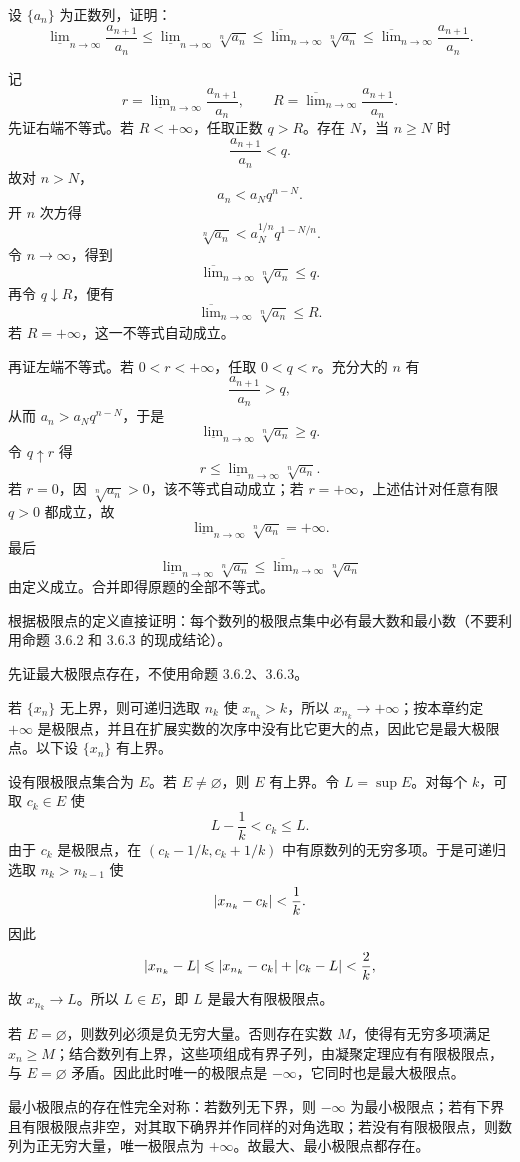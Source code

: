 \begin{xexercise}[5]
设 $\{a_n\}$ 为正数列，证明：
  \[
    \underline{\lim}_{n\to\infty}\frac{a_{n+1}}{a_n}
    \leqslant\underline{\lim}_{n\to\infty}\sqrt[n]{a_n}
    \leqslant\overline{\lim}_{n\to\infty}\sqrt[n]{a_n}
    \leqslant\overline{\lim}_{n\to\infty}\frac{a_{n+1}}{a_n}.
  \]
\end{xexercise}
\begin{xsolution}
记
\[
  r=\underline{\lim}_{n\to\infty}\frac{a_{n+1}}{a_n},
  \qquad
  R=\overline{\lim}_{n\to\infty}\frac{a_{n+1}}{a_n}.
\]
先证右端不等式。若 $R<+\infty$，任取正数 $q>R$。存在 $N$，当 $n\geqslant N$ 时
\[
  \frac{a_{n+1}}{a_n}<q.
\]
故对 $n>N$，
\[
  a_n<a_Nq^{n-N}.
\]
开 $n$ 次方得
\[
  \sqrt[n]{a_n}<a_N^{1/n}q^{1-N/n}.
\]
令 $n\to\infty$，得到
\[
  \overline{\lim}_{n\to\infty}\sqrt[n]{a_n}\leqslant q.
\]
再令 $q\downarrow R$，便有
\[
  \overline{\lim}_{n\to\infty}\sqrt[n]{a_n}\leqslant R.
\]
若 $R=+\infty$，这一不等式自动成立。

再证左端不等式。若 $0<r<+\infty$，任取 $0<q<r$。充分大的 $n$ 有
\[
  \frac{a_{n+1}}{a_n}>q,
\]
从而 $a_n>a_Nq^{n-N}$，于是
\[
  \underline{\lim}_{n\to\infty}\sqrt[n]{a_n}\geqslant q.
\]
令 $q\uparrow r$ 得
\[
  r\leqslant\underline{\lim}_{n\to\infty}\sqrt[n]{a_n}.
\]
若 $r=0$，因 $\sqrt[n]{a_n}>0$，该不等式自动成立；若 $r=+\infty$，上述估计对任意有限 $q>0$ 都成立，故
\[
  \underline{\lim}_{n\to\infty}\sqrt[n]{a_n}=+\infty.
\]
最后
\[
  \underline{\lim}_{n\to\infty}\sqrt[n]{a_n}
  \leqslant
  \overline{\lim}_{n\to\infty}\sqrt[n]{a_n}
\]
由定义成立。合并即得原题的全部不等式。
\end{xsolution}


\begin{xexercise}[6]
根据极限点的定义直接证明：每个数列的极限点集中必有最大数和最小数（不要利用命题 3.6.2 和 3.6.3 的现成结论）。
\end{xexercise}
\begin{xsolution}
先证最大极限点存在，不使用命题 3.6.2、3.6.3。

若 $\{x_n\}$ 无上界，则可递归选取 $n_k$ 使 $x_{n_k}>k$，所以 $x_{n_k}\to+\infty$；按本章约定 $+\infty$ 是极限点，并且在扩展实数的次序中没有比它更大的点，因此它是最大极限点。以下设 $\{x_n\}$ 有上界。

设有限极限点集合为 $E$。若 $E\neq\varnothing$，则 $E$ 有上界。令 $L=\sup E$。对每个 $k$，可取 $c_k\in E$ 使
\[
  L-\frac1k<c_k\leqslant L.
\]
由于 $c_k$ 是极限点，在 $(c_k-1/k,c_k+1/k)$ 中有原数列的无穷多项。于是可递归选取 $n_k>n_{k-1}$ 使
\[
  \lvert x_{n_k}-c_k\rvert<\frac1k.
\]
因此
\[
  \lvert x_{n_k}-L\rvert
  \leqslant\lvert x_{n_k}-c_k\rvert+\lvert c_k-L\rvert<\frac2k,
\]
故 $x_{n_k}\to L$。所以 $L\in E$，即 $L$ 是最大有限极限点。

若 $E=\varnothing$，则数列必须是负无穷大量。否则存在实数 $M$，使得有无穷多项满足 $x_n\geqslant M$；结合数列有上界，这些项组成有界子列，由凝聚定理应有有限极限点，与 $E=\varnothing$ 矛盾。因此此时唯一的极限点是 $-\infty$，它同时也是最大极限点。

最小极限点的存在性完全对称：若数列无下界，则 $-\infty$ 为最小极限点；若有下界且有限极限点非空，对其取下确界并作同样的对角选取；若没有有限极限点，则数列为正无穷大量，唯一极限点为 $+\infty$。故最大、最小极限点都存在。
\end{xsolution}


